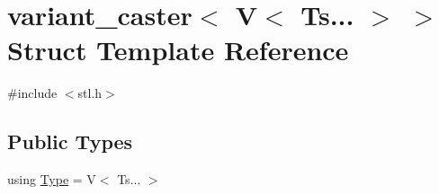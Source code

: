 \hypertarget{structvariant__caster_3_01_v_3_01_ts_8_8_8_01_4_01_4}{}\section{variant\+\_\+caster$<$ V$<$ Ts... $>$ $>$ Struct Template Reference}
\label{structvariant__caster_3_01_v_3_01_ts_8_8_8_01_4_01_4}


{\ttfamily \#include $<$stl.\+h$>$}

\subsection*{Public Types}
\begin{DoxyCompactItemize}
\item 
using \mbox{\hyperlink{structvariant__caster_3_01_v_3_01_ts_8_8_8_01_4_01_4_af19893dac45401bbb67d1adfd284d463}{Type}} = V$<$ Ts... $>$
\end{DoxyCompactItemize}
